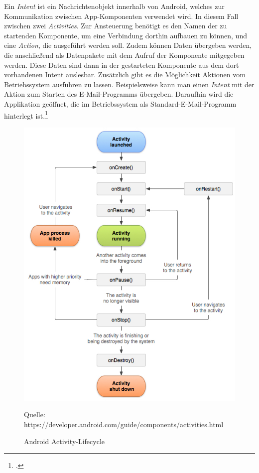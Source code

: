 Ein \textit{Intent} ist ein Nachrichtenobjekt innerhalb von Android, welches zur Kommunikation zwischen App-Komponenten verwendet wird. In diesem Fall zwischen zwei \textit{Activities}. Zur Ansteuerung benötigt es den Namen der zu startenden Komponente, um eine Verbindung dorthin aufbauen zu können, und eine \textit{Action}, die ausgeführt werden soll. Zudem können Daten übergeben werden, die anschließend als Datenpakete mit dem Aufruf der Komponente mitgegeben werden. Diese Daten sind dann in der gestarteten Komponente aus dem dort vorhandenen Intent auslesbar. Zusätzlich gibt es die Möglichkeit Aktionen vom Betriebssystem ausführen zu lassen. Beispielsweise kann man einen \textit{Intent} mit der Aktion zum Starten des E-Mail-Programms übergeben. Daraufhin wird die Applikation geöffnet, die im Betriebssystem als Standard-E-Mail-Programm hinterlegt ist.\footcite{Android-Intent}\\
\begin{figure}[!h]
\centering
\includegraphics[width=0.8\linewidth]{content/images/Android-ActivityLifecycle}
\caption{Android Activity-Lifecycle}
Quelle: https://developer.android.com/guide/components/activities.html
\label{pic:androidActivityLifecycle}
\end{figure}

